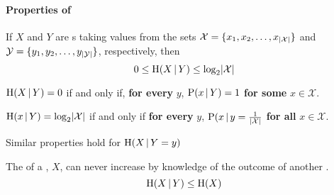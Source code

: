 \paragraph{Properties of }\label{par:Conditional_Entropy_Properties}
\begin{propertylist}
\item If $X$ and $Y$ are s taking values from the sets $\mathcal{X} = \lbrace x_{1}, x_{2}, \ldots, x_{\lvert \mathcal{X} \rvert} \rbrace$ and $\mathcal{Y} = \lbrace y_{1}, y_{2}, \ldots, y_{\lvert \mathcal{Y} \rvert} \rbrace$, respectively, then\label{prop:Conditional_Entropy_Bounds}
  \begin{equation}\label{eq:Conditional_Entropy_Bounds}
    0 \leq \operatorname{\operatorname{H}}(X \operatorname{\vert} Y) \leq \log_{2} \lvert \mathcal{X} \rvert
  \end{equation}
\item $\operatorname{\operatorname{H}}(X \operatorname{\vert} Y) = 0$ if and only if, \textbf{for every} $y$, $\operatorname{\operatorname{P}}(x \operatorname{\vert} Y) = 1$ \textbf{for some} $x \in \mathcal{X}$.\label{prop:Conditional_Entropy_Min_Bound}
\item $\operatorname{\operatorname{H}}(x \operatorname{\vert} Y) = \log_{2} \lvert \mathcal{X} \rvert$ if and only if \textbf{for every} $y$, $\operatorname{\operatorname{P}}(x \operatorname{\vert} y = \frac{1}{\lvert \mathcal{X} \rvert}$ \textbf{for all} $x \in \mathcal{X}$.\label{prop:Conditional_Entropy_Max_Bound}
\item Similar properties hold for $\operatorname{\operatorname{H}}(X \operatorname{\vert} Y=y)$
\item The  of a , $X$, can never increase by knowledge of the outcome of another .\label{prop:Conditional_Entropy_Bounded_By_Entropy}
  \begin{equation}\label{eq:Conditional_Entropy_Bounded_By_Entropy}
    \operatorname{\operatorname{H}}(X \operatorname{\vert} Y) \leq \operatorname{\operatorname{H}}(X)
  \end{equation}
\end{propertylist}

